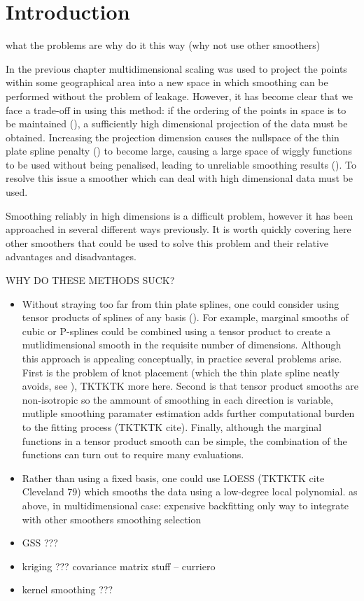 
\label{chap-gds}


\section{Introduction}


   what the problems are
   why do it this way (why not use other smoothers)
   

In the previous chapter multidimensional scaling was used to project the points within some geographical area into a new space in which smoothing can be performed without the problem of leakage. However, it has become clear that we face a trade-off in using this method: if the ordering of the points in space is to be maintained (), a sufficiently high dimensional projection of the data must be obtained. Increasing the projection dimension causes the nullspace of the thin plate spline penalty () to become large, causing a large space of wiggly functions to be used without being penalised, leading to unreliable smoothing results (). To resolve this issue a smoother which can deal with high dimensional data must be used. 

Smoothing reliably in high dimensions is a difficult problem, however it has been approached in several different ways previously. It is worth quickly covering here other smoothers that could be used to solve this problem and their relative advantages and disadvantages.

WHY DO THESE METHODS SUCK?
\begin{itemize}
   \item Without straying too far from thin plate splines, one could consider using tensor products of splines of any basis (). For example, marginal smooths of cubic or P-splines could be combined using a tensor product to create a mutlidimensional smooth in the requisite number of dimensions. Although this approach is appealing conceptually, in practice several problems arise. First is the problem of knot placement (which the thin plate spline neatly avoids, see ), TKTKTK more here. Second is that tensor product smooths are non-isotropic so the ammount of smoothing in each direction is variable, mutliple smoothing paramater estimation adds further computational burden to the fitting process (TKTKTK cite). Finally, although the marginal functions in a tensor product smooth can be simple, the combination of the functions can turn out to require many evaluations.
   \item Rather than using a fixed basis, one could use LOESS (TKTKTK cite Cleveland 79) which smooths the data using a low-degree local polynomial. 
         as above, in multidimensional case: expensive 
         backfitting only way to integrate with other smoothers
         smoothing selection
   \item GSS
         ???
   \item kriging ???
         covariance matrix stuff -- curriero
   \item kernel smoothing ???
\end{itemize}



